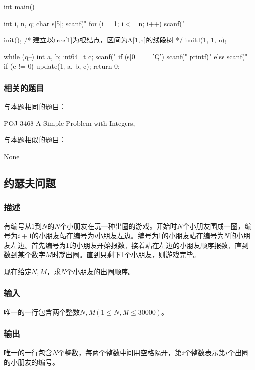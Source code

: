 \begin{Codex}[label=poj3468.c]
int main() {
    int i, n, q;
    char s[5];
    scanf("%
    for (i = 1; i <= n; i++) scanf("%

    init();
    /* 建立以tree[1]为根结点，区间为A[1,n]的线段树 */
    build(1, 1, n);

    while (q--) {
        int a, b;
        int64_t c;
        scanf("%
        if (s[0] == 'Q') {
            scanf("%
            printf("%
        } else {
            scanf("%
            if (c != 0) update(1, a, b, c);
        }
    }
    return 0;
}
\end{Codex}

\subsubsection{相关的题目}
与本题相同的题目：
\begindot
\item POJ 3468 A Simple Problem with Integers, 
\myenddot

与本题相似的题目：
\begindot
\item None
\myenddot


\subsection{约瑟夫问题} %
\subsubsection{描述}
有编号从1到$N$的$N$个小朋友在玩一种出圈的游戏。开始时$N$个小朋友围成一圈，编号为$i+1$的小朋友站在编号为$i$小朋友左边。编号为1的小朋友站在编号为$N$的小朋友左边。首先编号为1的小朋友开始报数，接着站在左边的小朋友顺序报数，直到数到某个数字$M$时就出圈。直到只剩下1个小朋友，则游戏完毕。

现在给定$N,M$，求$N$个小朋友的出圈顺序。

\subsubsection{输入}
唯一的一行包含两个整数$N,M(1 \leq N,M \leq 30000)$。

\subsubsection{输出}
唯一的一行包含$N$个整数，每两个整数中间用空格隔开，第$i$个整数表示第$i$个出圈的小朋友的编号。

